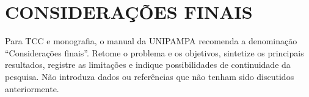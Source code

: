 
\chapter{CONSIDERAÇÕES FINAIS}

Para TCC e monografia, o manual da UNIPAMPA recomenda a denominação \enquote{Considerações finais}. Retome o problema e os objetivos, sintetize os principais resultados, registre as limitações e indique possibilidades de continuidade da pesquisa. Não introduza dados ou referências que não tenham sido discutidos anteriormente.
